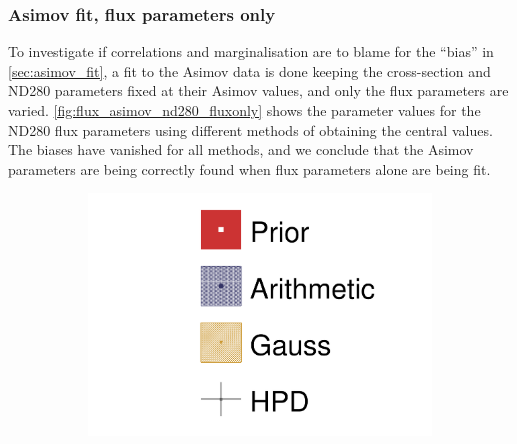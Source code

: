 \subsubsection{Asimov fit, flux parameters only}
To investigate if correlations and marginalisation are to blame for the ``bias'' in \autoref{sec:asimov_fit}, a fit to the Asimov data is done keeping the cross-section and ND280 parameters fixed at their Asimov values, and only the flux parameters are varied. \autoref{fig:flux_asimov_nd280_fluxonly} shows the parameter values for the ND280 flux parameters using different methods of obtaining the central values. The biases have vanished for all methods, and we conclude that the Asimov parameters are being correctly found when flux parameters alone are being fit.

\begin{figure}[h]
	\begin{subfigure}[t]{0.10\textwidth}
		\includegraphics[width=\textwidth, trim={0mm 0mm 0mm 0mm}, clip,page=1]{figures/mach3/Asimov/2017b_Asimov_July2017_FixND280_FixXsec_0_drawPar}
	\end{subfigure}
	

\end{figure}
